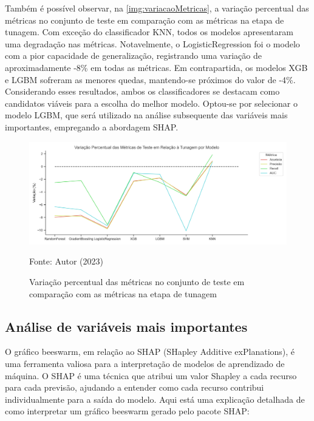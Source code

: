 Também é possível observar, na \autoref{img:variacaoMetricas}, a variação percentual das métricas no conjunto de teste em comparação com as métricas na etapa de tunagem. Com exceção do classificador KNN, todos os modelos apresentaram uma degradação nas métricas. Notavelmente, o LogisticRegression foi o modelo com a pior capacidade de generalização, registrando uma variação de aproximadamente -8\% em todas as métricas. Em contrapartida, os modelos XGB e LGBM sofreram as menores quedas, mantendo-se próximos do valor de -4\%. Considerando esses resultados, ambos os classificadores se destacam como candidatos viáveis para a escolha do melhor modelo. Optou-se por selecionar o modelo LGBM, que será utilizado na análise subsequente das variáveis mais importantes, empregando a abordagem SHAP.

\begin{figure}[H]
	\centering
	\caption{\label{img:variacaoMetricas}Variação percentual das métricas no conjunto de teste em comparação com as métricas na etapa de tunagem}
	\includegraphics[scale=0.7]{USPSC-img/variacao_pct_metricas_teste_por_modelo.png}
	\begin{center}
		Fonte: Autor (2023)
	\end{center}
\end{figure}

\subsection{Análise de variáveis mais importantes}

O gráfico beeswarm, em relação ao SHAP (SHapley Additive exPlanations), é uma ferramenta valiosa para a interpretação de modelos de aprendizado de máquina. O SHAP é uma técnica que atribui um valor Shapley a cada recurso para cada previsão, ajudando a entender como cada recurso contribui individualmente para a saída do modelo. Aqui está uma explicação detalhada de como interpretar um gráfico beeswarm gerado pelo pacote SHAP:

